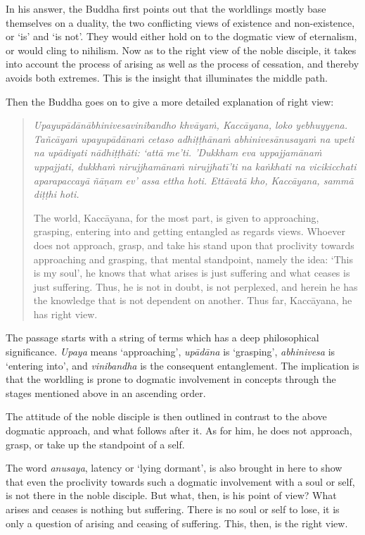 In his answer, the Buddha first points out that the worldlings mostly base themselves on a duality, the two conflicting views of existence and non-existence, or `is' and `is not'. They would either hold on to the dogmatic view of eternalism, or would cling to nihilism. Now as to the right view of the noble disciple, it takes into account the process of arising as well as the process of cessation, and thereby avoids both extremes. This is the insight that illuminates the middle path.

Then the Buddha goes on to give a more detailed explanation of right view:

\begin{quote}
\emph{Upayupādānābhinivesavinibandho khvāyaṁ, Kaccāyana, loko yebhuyyena. Tañcāyaṁ upayupādānaṁ cetaso adhiṭṭhānaṁ abhinivesānusayaṁ na upeti na upādiyati nādhiṭṭhāti: `attā me'ti. 'Dukkham eva uppajjamānaṁ uppajjati, dukkhaṁ nirujjhamānaṁ nirujjhatī'ti na kaṅkhati na vicikicchati aparapaccayā ñāṇam ev' assa ettha hoti. Ettāvatā kho, Kaccāyana, sammā diṭṭhi hoti.}

The world, Kaccāyana, for the most part, is given to approaching, grasping, entering into and getting entangled as regards views. Whoever does not approach, grasp, and take his stand upon that proclivity towards approaching and grasping, that mental standpoint, namely the idea: `This is my soul', he knows that what arises is just suffering and what ceases is just suffering. Thus, he is not in doubt, is not perplexed, and herein he has the knowledge that is not dependent on another. Thus far, Kaccāyana, he has right view.
\end{quote}

The passage starts with a string of terms which has a deep philosophical significance. \emph{Upaya} means `approaching', \emph{upādāna} is `grasping', \emph{abhinivesa} is `entering into', and \emph{vinibandha} is the consequent entanglement. The implication is that the worldling is prone to dogmatic involvement in concepts through the stages mentioned above in an ascending order.

The attitude of the noble disciple is then outlined in contrast to the above dogmatic approach, and what follows after it. As for him, he does not approach, grasp, or take up the standpoint of a self.

The word \emph{anusaya}, latency or `lying dormant', is also brought in here to show that even the proclivity towards such a dogmatic involvement with a soul or self, is not there in the noble disciple. But what, then, is his point of view? What arises and ceases is nothing but suffering. There is no soul or self to lose, it is only a question of arising and ceasing of suffering. This, then, is the right view.

